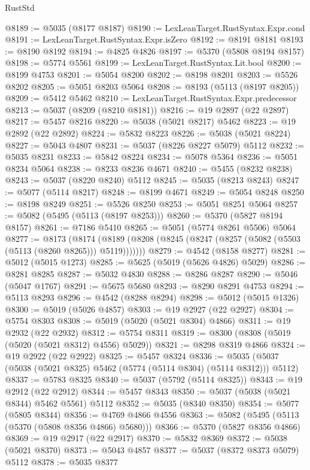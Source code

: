 \begin{lexlean}{RustStd}
\begin{coremodule}
@8189 := @5035 (@8177 @8187)
@8190 := LexLeanTarget.RustSyntax.Expr.cond
@8191 := LexLeanTarget.RustSyntax.Expr.isZero
@8192 := @8191 @8181
@8193 := @8190 @8192
@8194 := @4825 @4826
@8197 := @5370 (@5808 @8194 @8157)
@8198 := @5774 @5561
@8199 := LexLeanTarget.RustSyntax.Lit.bool
@8200 := @8199 @4753
@8201 := @5054 @8200
@8202 := @8198 @8201
@8203 := @5526 @8202
@8205 := @5051 @8203 @5064
@8208 := @8193 (@5113 (@8197 @8205))
@8209 := @5412 @5462
@8210 := LexLeanTarget.RustSyntax.Expr.predecessor
@8213 := @5037 (@8209 (@8210 @8181))
@8216 := @19 @2897 (@22 @2897)
@8217 := @5457 @8216
@8220 := @5038 (@5021 @8217) @5462
@8223 := @19 @2892 (@22 @2892)
@8224 := @5832 @8223
@8226 := @5038 (@5021 @8224)
@8227 := @5043 @4807
@8231 := @5037 (@8226 @8227 @5079) @5112
@8232 := @5035 @8231
@8233 := @5842 @8224
@8234 := @5078 @5364
@8236 := @5051 @8234 @5064
@8238 := @8233 @8236 @4671
@8240 := @5455 (@8232 @8238)
@8243 := @5037 (@8220 @8240) @5112
@8245 := @5035 (@8213 @8243)
@8247 := @5077 (@5114 @8217)
@8248 := @8199 @4671
@8249 := @5054 @8248
@8250 := @8198 @8249
@8251 := @5526 @8250
@8253 := @5051 @8251 @5064
@8257 := @5082 (@5495 (@5113 (@8197 @8253)))
@8260 := @5370 (@5827 @8194 @8157)
@8261 := @7186 @5410
@8265 := @5051 (@5774 @8261 @5506) @5064
@8277 := @8173
    (@8174 (@8189 (@8208 (@8245 (@8247 (@8257 (@5082 (@5503 (@5113 (@8260 @8265))) @5119)))))))
@8279 := @4542 (@8158 @8277)
@8281 := @5012 (@5015 @1273)
@8285 := @5625 (@5019 (@5626 @4826) @5029)
@8286 := @8281 @8285
@8287 := @5032 @4830
@8288 := @8286 @8287
@8290 := @5046 (@5047 @1767)
@8291 := @5675 @5680
@8293 := @8290 @8291 @4753
@8294 := @5113 @8293
@8296 := @4542 (@8288 @8294)
@8298 := @5012 (@5015 @1326)
@8300 := @5019 (@5026 @4857)
@8303 := @19 @2927 (@22 @2927)
@8304 := @5754 @8303
@8308 := @5019 (@5020 (@5021 @8304) @4866)
@8311 := @19 @2932 (@22 @2932)
@8312 := @5754 @8311
@8319 := @8300 (@8308 (@5019 (@5020 (@5021 @8312) @4556) @5029))
@8321 := @8298 @8319 @4866
@8324 := @19 @2922 (@22 @2922)
@8325 := @5457 @8324
@8336 := @5035 (@5037 (@5038 (@5021 @8325) @5462 (@5774 (@5114 @8304) (@5114 @8312))) @5112)
@8337 := @5783 @8325
@8340 := @5037 (@5792 (@5114 @8325))
@8343 := @19 @2912 (@22 @2912)
@8344 := @5457 @8343
@8350 := @5037 (@5038 (@5021 @8344) @5462 @5561) @5112
@8352 := @5035 (@8340 @8350)
@8354 := @5077 (@5805 @8344)
@8356 := @4769 @4866 @4556
@8363 := @5082 (@5495 (@5113 (@5370 (@5808 @8356 @4866) @5680)))
@8366 := @5370 (@5827 @8356 @4866)
@8369 := @19 @2917 (@22 @2917)
@8370 := @5832 @8369
@8372 := @5038 (@5021 @8370)
@8373 := @5043 @4857
@8377 := @5037 (@8372 @8373 @5079) @5112
@8378 := @5035 @8377

\end{coremodule}
\end{lexlean}
